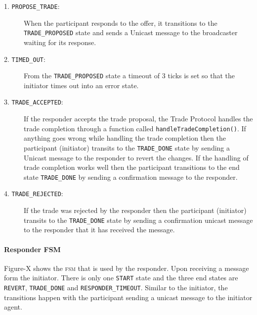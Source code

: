 \begin{description}
	\item[1. \texttt{PROPOSE\_TRADE}:]
	When the participant responds to the offer, it transitions to the \texttt{TRADE\_PROPOSED} state and sends a Unicast message to the broadcaster waiting for its response.
	\item[2. \texttt{TIMED\_OUT}:]
	From the \texttt{TRADE\_PROPOSED} state a timeout of 3 ticks is set so that the initiator times out into an error state.
	\item[3. \texttt{TRADE\_ACCEPTED}:]
	If the responder accepts the trade proposal, the Trade Protocol handles the trade completion through a function called \texttt{handleTradeCompletion()}. If anything goes wrong while handling the trade completion then the participant (initiator) transits to the \texttt{TRADE\_DONE} state by sending a Unicast message to the responder to revert the changes. If the handling of trade completion works well then the participant transitions to the end state \texttt{TRADE\_DONE} by sending a confirmation message to the responder.
	\item[4. \texttt{TRADE\_REJECTED}:]
	If the trade was rejected by the responder then the participant (initiator) transits to the \texttt{TRADE\_DONE} state by sending a confirmation unicast message to the responder that it has received the message.
\end{description}

\paragraph{Responder FSM}

%
%

Figure-X shows the \textsc{fsm} that is used by the responder. Upon receiving a message form the initiator. There is only one \texttt{START} state and the three end states are \texttt{REVERT}, \texttt{TRADE\_DONE} and \texttt{RESPONDER\_TIMEOUT}. Similar to the initiator, the transitions happen with the participant sending a unicast message to the initiator agent.
 

